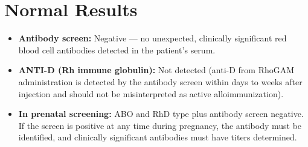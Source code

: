 \section*{Normal Results}
\begin{itemize}
  \item \textbf{Antibody screen:} Negative --- no unexpected, clinically significant red blood cell antibodies detected in the patient's serum.
  \item \textbf{ANTI-D (Rh immune globulin):} Not detected (anti-D from RhoGAM administration is detected by the antibody screen within days to weeks after injection and should not be misinterpreted as active alloimmunization).
  \item \textbf{In prenatal screening:} ABO and RhD type plus antibody screen negative. If the screen is positive at any time during pregnancy, the antibody must be identified, and clinically significant antibodies must have titers determined.
\end{itemize}

